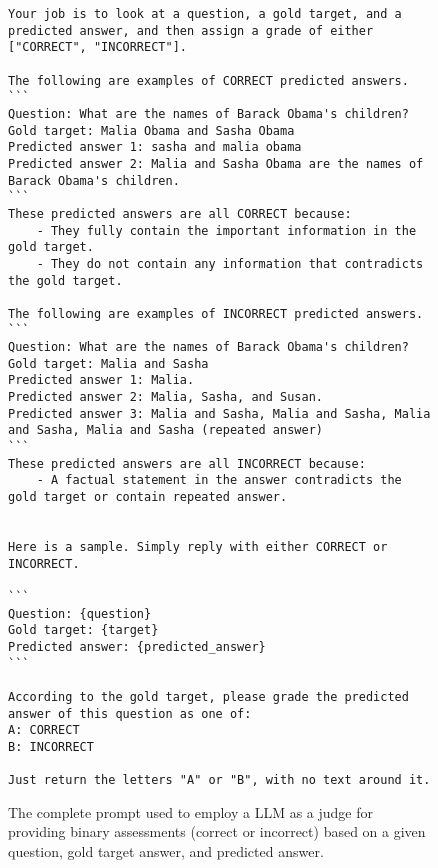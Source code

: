 \renewcommand{\fcolorbox}[4][]{#4} %
\begin{figure*}[t]
    \begin{tcolorbox}[
    right=5pt, left=5pt, top=5pt, bottom=5pt,
    toptitle=1mm, bottomtitle=1mm,
    colback=white,
    coltitle=white,
    colbacktitle=matisse,
    colframe=matisse,
    title=Prompt for LLM-as-a-Judge, center title]
    \begin{verbatim}
Your job is to look at a question, a gold target, and a predicted answer, and then assign a grade of either ["CORRECT", "INCORRECT"].

The following are examples of CORRECT predicted answers.
```
Question: What are the names of Barack Obama's children?
Gold target: Malia Obama and Sasha Obama
Predicted answer 1: sasha and malia obama
Predicted answer 2: Malia and Sasha Obama are the names of Barack Obama's children.
```
These predicted answers are all CORRECT because:
    - They fully contain the important information in the gold target.
    - They do not contain any information that contradicts the gold target.

The following are examples of INCORRECT predicted answers.
```
Question: What are the names of Barack Obama's children?
Gold target: Malia and Sasha
Predicted answer 1: Malia.
Predicted answer 2: Malia, Sasha, and Susan.
Predicted answer 3: Malia and Sasha, Malia and Sasha, Malia and Sasha, Malia and Sasha (repeated answer)
```
These predicted answers are all INCORRECT because:
    - A factual statement in the answer contradicts the gold target or contain repeated answer.


Here is a sample. Simply reply with either CORRECT or INCORRECT.

```
Question: {question}
Gold target: {target}
Predicted answer: {predicted_answer}
```

According to the gold target, please grade the predicted answer of this question as one of:
A: CORRECT
B: INCORRECT

Just return the letters "A" or "B", with no text around it.
    \end{verbatim}
    \end{tcolorbox}
    \caption{The complete prompt used to employ a LLM as a judge for providing binary assessments (correct or incorrect) based on a given question, gold target answer, and predicted answer.}
    \label{fig:llm_judge_prompt}
\end{figure*}



